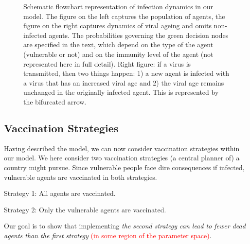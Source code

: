 \documentclass[a4paper,12pt]{article}
\newcommand{\ignacio}[1]{\textcolor{red}{#1}}
\begin{document}
\begin{figure}
\begin{center}
{
}      
\end{center}
\caption{Schematic flowchart representation of infection dynamics in our model. The figure on the left captures the population of agents, the figure on the right captures dynamics of viral ageing and omits non-infected agents. The probabilities governing the green decision nodes are specified in the text, which depend on the type of the agent (vulnerable or not) and on the immunity level of the agent (not represented here in full detail). Right figure: if a virus is transmitted, then two things happen: 1) a new agent is infected with a virus that has an increased viral age and 2) the viral age remains unchanged in the originally infected agent. This is represented by the bifurcated arrow.}
\label{fig:Flowchart}
\end{figure}

\subsection{Vaccination Strategies}
Having described the model, we can now consider vaccination strategies within our model. We here consider two vaccination strategies (a central planner of) a country might pursue. Since vulnerable people face dire consequences if infected, vulnerable agents are vaccinated in both strategies.
\begin{description}
\item Strategy 1: All agents are vaccinated.
\item Strategy 2: Only the vulnerable agents are vaccinated.
\end{description}
Our goal is to show that implementing \emph{the second strategy can lead to fewer dead agents than the first strategy} \ignacio{(in some region of the parameter space)}.
\end{document}
